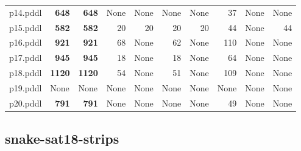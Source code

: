 \documentclass{article}
\begin{document}
\begin{tabular}{@{}lrrrrrrrrr@{}}
p14.pddl & \textbf{648} & \textbf{648} & \multicolumn{1}{|l|}{None} & \multicolumn{1}{|l|}{None} & \multicolumn{1}{|l|}{None} & \multicolumn{1}{|l|}{None} & 37 & \multicolumn{1}{|l|}{None} & \multicolumn{1}{|l|}{None} \\
p15.pddl & \textbf{582} & \textbf{582} & 20 & 20 & 20 & 20 & 44 & \multicolumn{1}{|l|}{None} & 44 \\
p16.pddl & \textbf{921} & \textbf{921} & 68 & \multicolumn{1}{|l|}{None} & 62 & \multicolumn{1}{|l|}{None} & 110 & \multicolumn{1}{|l|}{None} & \multicolumn{1}{|l|}{None} \\
p17.pddl & \textbf{945} & \textbf{945} & 18 & \multicolumn{1}{|l|}{None} & 18 & \multicolumn{1}{|l|}{None} & 64 & \multicolumn{1}{|l|}{None} & \multicolumn{1}{|l|}{None} \\
p18.pddl & \textbf{1120} & \textbf{1120} & 54 & \multicolumn{1}{|l|}{None} & 51 & \multicolumn{1}{|l|}{None} & 109 & \multicolumn{1}{|l|}{None} & \multicolumn{1}{|l|}{None} \\
p19.pddl & \multicolumn{1}{|l|}{None} & \multicolumn{1}{|l|}{None} & \multicolumn{1}{|l|}{None} & \multicolumn{1}{|l|}{None} & \multicolumn{1}{|l|}{None} & \multicolumn{1}{|l|}{None} & \multicolumn{1}{|l|}{None} & \multicolumn{1}{|l|}{None} & \multicolumn{1}{|l|}{None} \\
p20.pddl & \textbf{791} & \textbf{791} & \multicolumn{1}{|l|}{None} & \multicolumn{1}{|l|}{None} & \multicolumn{1}{|l|}{None} & \multicolumn{1}{|l|}{None} & 49 & \multicolumn{1}{|l|}{None} & \multicolumn{1}{|l|}{None} \\
\end{tabular}

\hypertarget{initial_h_value-snake-sat18-strips}{}
\subsection*{snake-sat18-strips}
\end{document}
